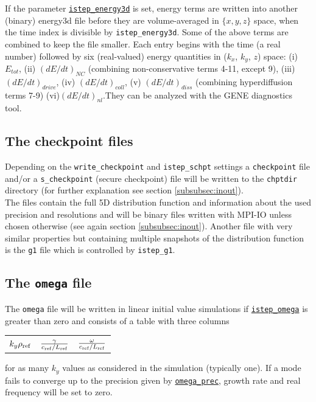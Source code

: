 \documentclass[12pt]{article}
\begin{document}
If the parameter \hyperlink{istep_energy3d}{\tt istep\_energy3d} is set,
energy terms are written into another (binary) energy3d file before they are
volume-averaged in $\{x,y,z\}$ space, when the time index is divisible
by {\tt istep\_energy3d}. Some of the above terms are combined to
keep the file smaller. Each entry begins with the time (a real number)
followed by six (real-valued) energy quantities in ($k_x$, $k_y$, $z$)
space: (i) $E_{tot}$, (ii)
$(dE/dt)_{NC}$ (combining non-conservative terms 4-11, except 9), (iii)
$(dE/dt)_{drive}$, (iv) $(dE/dt)_{coll}$, (v) $(dE/dt)_{diss}$
(combining hyperdiffusion terms 7-9) (vi)$(dE/dt)_{nl}$.They can be analyzed with the
{\sc GENE} diagnostics tool. 

\subsection{The checkpoint files}
\label{subsec:chpt-files}
Depending on the {\tt write\_checkpoint} and {\tt istep\_schpt} settings a {\tt checkpoint} file 
and/or a {\tt s\_checkpoint} (secure checkpoint) file will be written to the {\tt chptdir} 
directory (for further explanation see section \ref{subsubsec:inout}). \\
The files contain the full 5D distribution function and information about the used precision and 
resolutions and will be binary files written with MPI-IO unless chosen otherwise 
(see again section \ref{subsubsec:inout}). Another file with very similar properties but 
containing multiple snapshots of the distribution function is the {\tt g1} file which is 
controlled by {\tt istep\_g1}.

\subsection{The \texttt{omega} file}
\label{subsec:omega-file}

The {\tt omega} file will be written in linear initial value simulations 
if \hyperlink{istep_omega}{\tt istep\_omega} is greater than
zero and consists of a table with three columns
\begin{center}
\begin{tabular}{lll}
$k_y\rho_{\rm ref}$ & $\frac{\gamma}{c_{\rm ref}/L_{\rm ref}}$ & $\frac{\omega}{c_{\rm ref} / L_{\rm ref}}$
\end{tabular}
\end{center}
for as many $k_y$ values as considered in the simulation (typically one).
If a mode fails to converge up to the precision given by \hyperlink{omega_prec}{\tt omega\_prec}, 
growth rate and real frequency will be set to zero.
\end{document}
